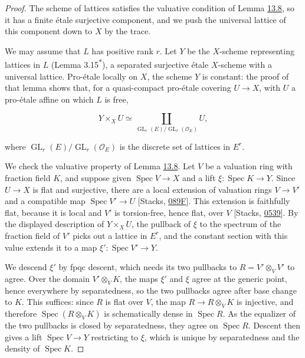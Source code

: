 \documentclass[11pt]{article}
\newcommand{\bpout}[1]{#1\textsuperscript{\hyperlink{bp-outside}{\ensuremath{\ast}}}}
\providecommand{\GL}{}\renewcommand{\GL}{\operatorname{GL}}
\begin{document}
\begin{proof}[{Proof}]\label{bp32}%
The scheme of lattices satisfies the valuative condition of Lemma \hyperref[bp28]{13.8}, so it has a finite étale surjective component, and we push the universal lattice of this component down to \(X\) by the trace.

We may assume that \(L\) has positive rank \(r\). Let \(Y\) be the \(X\)-scheme representing lattices in \(L\) (Lemma \bpout{3.15}), a separated surjective étale \(X\)-scheme with a universal lattice. Pro-étale locally on \(X\), the scheme \(Y\) is constant: the proof of that lemma shows that, for a quasi-compact pro-étale covering \(U\to X\), with \(U\) a pro-étale affine on which \(L\) is free,

\[
Y\times_XU\simeq
\coprod_{\GL_r(E)/\GL_r(\mathcal O_E)} U,
\]

where \(\GL_r(E)/\GL_r(\mathcal O_E)\) is the discrete set of lattices in \(E^r\).

We check the valuative property of Lemma \hyperref[bp28]{13.8}. Let \(V\) be a valuation ring with fraction field \(K\), and suppose given \(\operatorname{Spec}V\to X\) and a lift \(\xi:\operatorname{Spec}K\to Y\). Since \(U\to X\) is flat and surjective, there are a local extension of valuation rings \(V\to V'\) and a compatible map \(\operatorname{Spec}V'\to U\) [Stacks, \href{https://stacks.math.columbia.edu/tag/089F}{089F}]. This extension is faithfully flat, because it is local and \(V'\) is torsion-free, hence flat, over \(V\) [Stacks, \href{https://stacks.math.columbia.edu/tag/0539}{0539}]. By the displayed description of \(Y\times_XU\), the pullback of \(\xi\) to the spectrum of the fraction field of \(V'\) picks out a lattice in \(E^r\), and the constant section with this value extends it to a map \(\xi':\operatorname{Spec}V'\to Y\).

We descend \(\xi'\) by fpqc descent, which needs its two pullbacks to \(R=V'\otimes_VV'\) to agree. Over the domain \(V'\otimes_VK\), the maps \(\xi'\) and \(\xi\) agree at the generic point, hence everywhere by separatedness, so the two pullbacks agree after base change to \(K\). This suffices: since \(R\) is flat over \(V\), the map \(R\to R\otimes_VK\) is injective, and therefore \(\operatorname{Spec}(R\otimes_VK)\) is schematically dense in \(\operatorname{Spec}R\). As the equalizer of the two pullbacks is closed by separatedness, they agree on \(\operatorname{Spec}R\). Descent then gives a lift \(\operatorname{Spec}V\to Y\) restricting to \(\xi\), which is unique by separatedness and the density of \(\operatorname{Spec}K\).


\end{proof}
\end{document}
